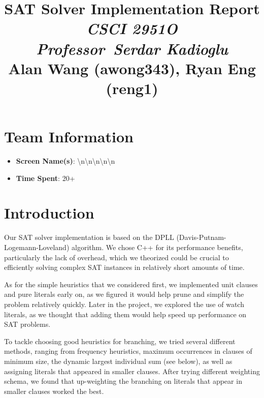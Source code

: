 \documentclass[titlepage]{article}
\newcommand{\noteTitle}{SAT Solver Implementation Report}
\newcommand{\professor}{Serdar Kadioglu}
\newcommand{\class}{CSCI 2951O}
\newcommand{\notesAuthor}{Alan Wang (awong343), Ryan Eng (reng1)}
\begin{document}
\title{
  \textmd{\LARGE{\textbf{\noteTitle}}}\\
  \vspace{5pt}
  \textmd{\Large{\textit{\class}}}\\
  \textmd{\Large{\textit{Professor\ \professor}}}\\
  \vspace{3.5in}
  \textmd{\LARGE{\textbf{\notesAuthor}}}\\
  \date{}
  \author{}
}

\section*{Team Information}
\begin{itemize}
    \item \textbf{Screen Name(s)}: \textbackslash n\textbackslash n\textbackslash n\textbackslash n\textbackslash n
    \item \textbf{Time Spent}: 20+
\end{itemize}

\section*{Introduction}
Our SAT solver implementation is based on the DPLL (Davis-Putnam-Logemann-Loveland) algorithm. We chose C++ for its performance benefits, particularly the lack of overhead, which we theorized could be crucial to efficiently solving complex SAT instances in relatively short amounts of time.

\vspace{10pt}

\noindent As for the simple heuristics that we considered first, we implemented unit clauses and pure literals early on, as we figured it would help prune and simplify the problem relatively quickly. Later in the project, we explored the use of watch literals, as we thought that adding them would help speed up performance on SAT problems. 

\vspace{10pt}

\noindent To tackle choosing good heuristics for branching, we tried several different methods, ranging from frequency heuristics, maximum occurrences in clauses of minimum size, the dynamic largest individual sum (see below), as well as assigning literals that appeared in smaller clauses. After trying different weighting schema, we found that up-weighting the branching on literals that appear in smaller clauses worked the best.
\end{document}
